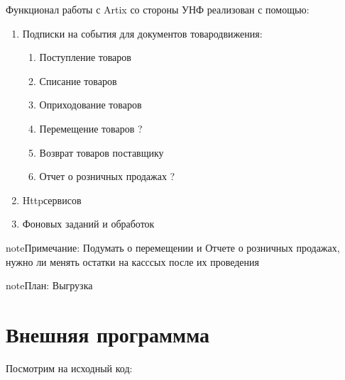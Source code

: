 \documentclass[twoside,11pt,a4paper,notitlepage]{report}
\begin{document}
Функционал работы с Artix со стороны УНФ реализован с помощью:
\begin{enumerate}
%
\item {} 
\sphinxAtStartPar
Подписки на события для документов товародвижения:
\begin{enumerate}
%
\item {} 
\sphinxAtStartPar
Поступление товаров

\item {} 
\sphinxAtStartPar
Списание товаров

\item {} 
\sphinxAtStartPar
Оприходование товаров

\item {} 
\sphinxAtStartPar
Перемещение товаров ?

\item {} 
\sphinxAtStartPar
Возврат товаров поставщику

\item {} 
\sphinxAtStartPar
Отчет о розничных продажах ?

\end{enumerate}

\item {} 
\sphinxAtStartPar
Http\sphinxhyphen{}сервисов

\item {} 
\sphinxAtStartPar
Фоновых заданий и обработок

\end{enumerate}

\begin{sphinxadmonition}{note}{Примечание:}
\sphinxAtStartPar
Подумать о перемещении и Отчете о розничных продажах, нужно ли менять остатки на касссых после их проведения
\end{sphinxadmonition}

\begin{sphinxadmonition}{note}{\label{\detokenize{unf:id2}}План:}
\sphinxAtStartPar
Выгрузка
\end{sphinxadmonition}

\sphinxstepscope


\chapter{Внешняя программма}
\label{\detokenize{prox:id1}}\label{\detokenize{prox::doc}}
\sphinxAtStartPar
Посмотрим на исходный код:
\end{document}
